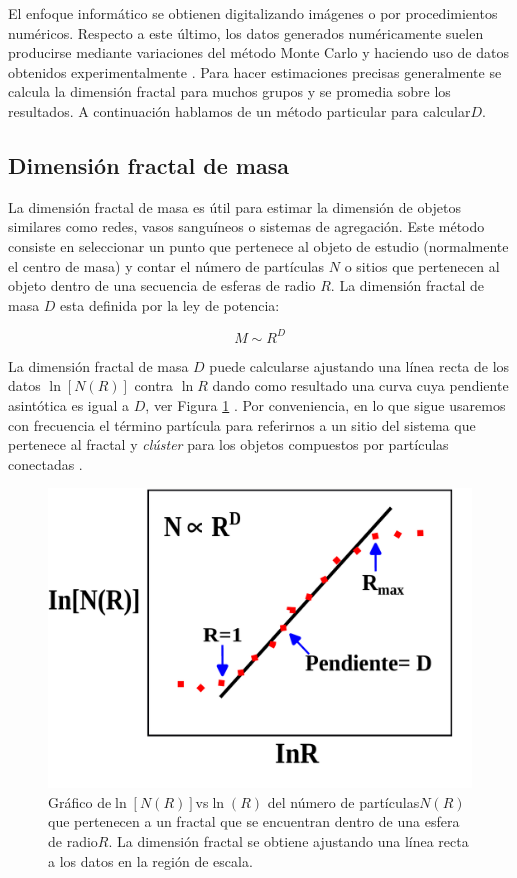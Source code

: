 El enfoque inform\'{a}tico se obtienen digitalizando im\'{a}genes o por procedimientos num\'{e}ricos. Respecto a este \'{u}ltimo, los datos generados num\'{e}ricamente suelen producirse mediante variaciones del m\'{e}todo Monte Carlo y haciendo uso de datos obtenidos experimentalmente \cite{Vicsek1992}. Para hacer estimaciones precisas generalmente se calcula la dimensi\'{o}n fractal para muchos grupos y se promedia sobre los resultados. A continuaci\'{o}n hablamos de un m\'{e}todo particular para calcular$D$.

\subsection{Dimensi\'{o}n fractal de masa}
\label{masa-radio}

La dimensi\'{o}n fractal de masa es \'{u}til para estimar la dimensi\'{o}n de objetos similares como redes, vasos sangu\'{i}neos o sistemas de agregaci\'{o}n. Este m\'{e}todo consiste en seleccionar un punto que pertenece al objeto de estudio (normalmente el centro de masa) y contar el n\'{u}mero de part\'{i}culas $N$ o sitios que pertenecen al objeto dentro de una secuencia de esferas de radio $R$. La dimensi\'{o}n fractal de masa $D$ esta definida por la ley de potencia:

\begin{equation}
	M \sim R^{D}
\end{equation}


La dimensi\'{o}n fractal de masa $D$ puede calcularse ajustando una l\'{i}nea recta de los datos $\ln[N(R)]$ contra $\ln R$ dando como resultado una curva cuya pendiente asint\'{o}tica es igual a $D$, ver Figura \ref{fig:D-Fractal} . Por conveniencia, en lo que sigue usaremos con frecuencia el t\'{e}rmino part\'{i}cula para referirnos a un sitio del sistema que pertenece al fractal y \textit{cl\'{u}ster} para los objetos compuestos por part\'{i}culas conectadas \cite{Vicsek1992}.


\begin{figure}[H]
	\begin{center}
		\includegraphics[width=0.5\linewidth]{graphs/dimension-fractal}
		\caption{Gr\'{a}fico de$\ln[N(R)]$vs$\ln (R)$ del n\'{u}mero de part\'{i}culas$N(R)$que pertenecen a un fractal que se encuentran dentro de una esfera de radio$R$. La dimensi\'{o}n fractal se obtiene ajustando una l\'{i}nea recta a los datos en la regi\'{o}n de escala.}
		\label{fig:D-Fractal}
	\end{center}
\end{figure}


